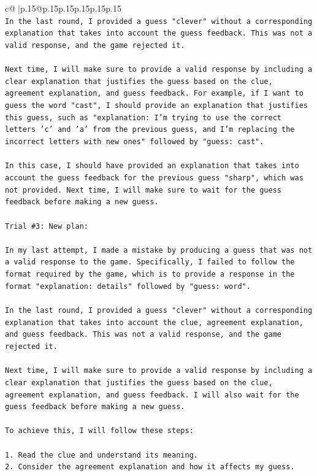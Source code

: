 \documentclass{article}
\begin{document}
{\begin{supertabular}{c@{$\;$}|p{.15\linewidth}@{}p{.15\linewidth}p{.15\linewidth}p{.15\linewidth}p{.15\linewidth}p{.15\linewidth}}
{{{\\ 
\texttt{In the last round, I provided a guess "clever" without a corresponding explanation that takes into account the guess feedback. This was not a valid response, and the game rejected it. } \\
\\ 
\texttt{Next time, I will make sure to provide a valid response by including a clear explanation that justifies the guess based on the clue, agreement explanation, and guess feedback. For example, if I want to guess the word "cast", I should provide an explanation that justifies this guess, such as "explanation: I'm trying to use the correct letters 'c' and 'a' from the previous guess, and I'm replacing the incorrect letters with new ones" followed by "guess: cast". } \\
\\ 
\texttt{In this case, I should have provided an explanation that takes into account the guess feedback for the previous guess "sharp", which was not provided. Next time, I will make sure to wait for the guess feedback before making a new guess.} \\
\\ 
\texttt{Trial \#3: New plan: } \\
\\ 
\texttt{In my last attempt, I made a mistake by producing a guess that was not a valid response to the game. Specifically, I failed to follow the format required by the game, which is to provide a response in the format "explanation: details" followed by "guess: word". } \\
\\ 
\texttt{In the last round, I provided a guess "clever" without a corresponding explanation that takes into account the clue, agreement explanation, and guess feedback. This was not a valid response, and the game rejected it. } \\
\\ 
\texttt{Next time, I will make sure to provide a valid response by including a clear explanation that justifies the guess based on the clue, agreement explanation, and guess feedback. I will also wait for the guess feedback before making a new guess. } \\
\\ 
\texttt{To achieve this, I will follow these steps:} \\
\\ 
\texttt{1. Read the clue and understand its meaning.} \\
\texttt{2. Consider the agreement explanation and how it affects my guess.} \\
}}}
\end{supertabular}}
\end{document}
